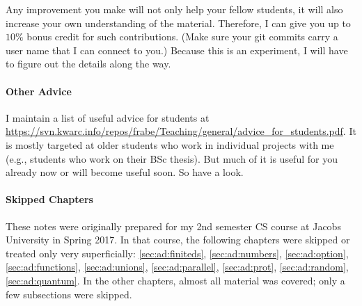 Any improvement you make will not only help your fellow students, it will also increase your own understanding of the material.
Therefore, I can give you up to $10\%$ bonus credit for such contributions.
(Make sure your git commits carry a user name that I can connect to you.)
Because this is an experiment, I will have to figure out the details along the way.

\paragraph{Other Advice}
I maintain a list of useful advice for students at \url{https://svn.kwarc.info/repos/frabe/Teaching/general/advice_for_students.pdf}.
It is mostly targeted at older students who work in individual projects with me (e.g., students who work on their BSc thesis).
But much of it is useful for you already now or will become useful soon.
So have a look.

\paragraph{Skipped Chapters}
These notes were originally prepared for my 2nd semester CS course at Jacobs University in Spring 2017.
In that course, the following chapters were skipped or treated only very superficially: \ref{sec:ad:finiteds}, \ref{sec:ad:numbers}, \ref{sec:ad:option}, \ref{sec:ad:functions}, \ref{sec:ad:unions}, \ref{sec:ad:parallel}, \ref{sec:ad:prot}, \ref{sec:ad:random}, \ref{sec:ad:quantum}.
In the other chapters, almost all material was covered; only a few subsections were skipped.